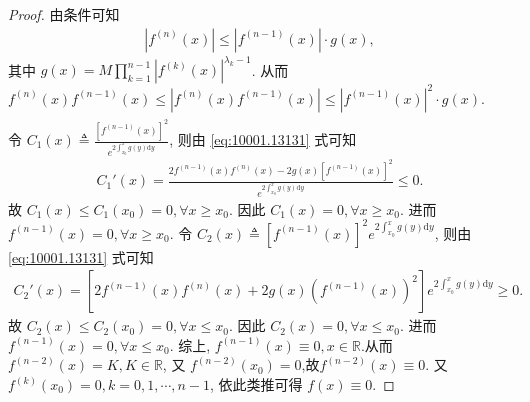 \documentclass[../../main.tex]{subfiles}
\begin{document}
\begin{proof}
由条件可知
\begin{align*}
|f^{(n)}(x)| \leqslant |f^{(n-1)}(x)| \cdot g(x),
\end{align*}
其中 $g(x) = M \prod_{k=1}^{n-1} |f^{(k)}(x)|^{\lambda_k - 1}$. 从而 $f^{(n)}(x) f^{(n-1)}(x) \leqslant |f^{(n)}(x) f^{(n-1)}(x)| \leqslant |f^{(n-1)}(x)|^2 \cdot g(x)$.
\begin{align}
\label{eq:10001.13131}
\end{align}
令 $C_1(x) \triangleq \frac{[f^{(n-1)}(x)]^2}{e^{2\int_{x_0}^x g(y) \mathrm{d}y}}$, 则由 \eqref{eq:10001.13131} 式可知
\begin{align*}
C_1'(x) = \frac{2f^{(n-1)}(x) f^{(n)}(x) - 2g(x) [f^{(n-1)}(x)]^2}{e^{2\int_{x_0}^x g(y) \mathrm{d}y}} \leqslant 0.
\end{align*}
故 $C_1(x) \leqslant C_1(x_0) = 0, \forall x \geqslant x_0$. 因此 $C_1(x) = 0, \forall x \geqslant x_0$. 进而 $f^{(n-1)}(x) = 0, \forall x \geqslant x_0$.
令 $C_2(x) \triangleq [f^{(n-1)}(x)]^2 e^{2\int_{x_0}^x g(y) \mathrm{d}y}$, 则由 \eqref{eq:10001.13131} 式可知
\begin{align*}
C_2'(x) = \left[ 2f^{(n-1)}(x) f^{(n)}(x) + 2g(x) (f^{(n-1)}(x))^2 \right] e^{2\int_{x_0}^x g(y) \mathrm{d}y} \geqslant 0.
\end{align*}
故 $C_2(x) \leqslant C_2(x_0) = 0, \forall x \leqslant x_0$. 因此 $C_2(x) = 0, \forall x \leqslant x_0$. 进而 $f^{(n-1)}(x) = 0, \forall x \leqslant x_0$.
综上, $f^{(n-1)}(x) \equiv 0, x \in \mathbb{R}$.从而$f^{(n-2)}(x)=K,K\in \mathbb{R}$, 又 $f^{(n-2)}(x_0) = 0$,故$f^{(n-2)}(x) \equiv 0$. 又 $f^{(k)}(x_0) = 0, k = 0, 1, \cdots, n-1$, 依此类推可得 $f(x) \equiv 0$.

\end{proof}
\end{document}
